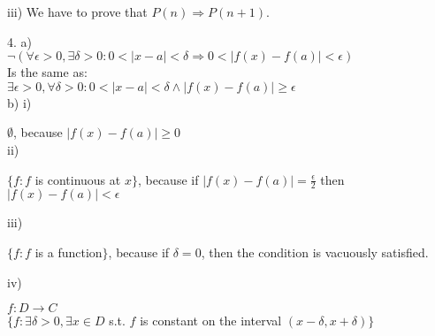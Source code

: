 \documentclass[11pt]{article}
\begin{document}
\begin{flushleft}
\bigskip iii) \bigskip
We have to prove that $P(n) \Rightarrow P(n+1)$.

\newpage



4. a) \\ \bigskip
$\neg ( \forall \epsilon > 0, \exists \delta > 0 : 0 < |x-a| < \delta \Rightarrow 0 < |f(x) - f(a)| < \epsilon ) $ \\
Is the same as: \\
$\exists \epsilon > 0, \forall \delta > 0 : 0 < |x-a| < \delta \wedge  |f(x) - f(a)| \geq \epsilon $ \\

\bigskip b) i) \bigskip

$\emptyset$, because $|f(x)-f(a)| \geq 0$ \\

\bigskip ii) \bigskip

$\{ f: f$ is continuous at $x \}$, because if $|f(x)-f(a)| = \frac{\epsilon}{2}$ then $|f(x)-f(a)| < \epsilon$

\bigskip iii) \bigskip

$\{ f: f$ is a function$\}$, because if $\delta = 0$, then the condition is vacuously satisfied.

\bigskip iv) \bigskip

$f: D \rightarrow C$ \\
$\{ f: \exists \delta > 0, \exists x \in D$ s.t. $f$ is constant on the interval $(x- \delta, x+ \delta ) \}$


\end{flushleft}
\end{document}
